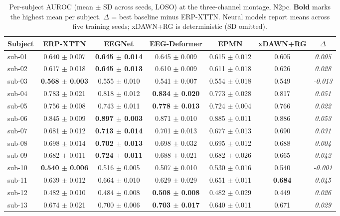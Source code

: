 \begin{table}[t]
\centering
\caption{Per-subject AUROC (mean $\pm$ SD across seeds, LOSO) at the three-channel montage, N2pc. \textbf{Bold} marks the highest mean per subject. $\Delta$ = best baseline minus ERP-XTTN. Neural models report means across five training seeds; xDAWN+RG is deterministic (SD omitted).}
\label{sup:tab-persubj-n2pc}
\begin{tabular}{lcccccc}
\toprule
Subject & ERP-XTTN & EEGNet & EEG-Deformer & EPMN & xDAWN+RG & $\Delta$ \\
\midrule
sub-01 & 0.640 $\pm$ 0.007 & \textbf{0.645 $\pm$ 0.014} & 0.645 $\pm$ 0.009 & 0.615 $\pm$ 0.012 & 0.605 & \textit{0.005} \\
sub-02 & 0.617 $\pm$ 0.018 & \textbf{0.645 $\pm$ 0.013} & 0.610 $\pm$ 0.009 & 0.611 $\pm$ 0.018 & 0.626 & \textit{0.028} \\
sub-03 & \textbf{0.568 $\pm$ 0.003} & 0.555 $\pm$ 0.010 & 0.541 $\pm$ 0.007 & 0.554 $\pm$ 0.018 & 0.549 & \textit{-0.013} \\
sub-04 & 0.783 $\pm$ 0.021 & 0.818 $\pm$ 0.012 & \textbf{0.834 $\pm$ 0.020} & 0.773 $\pm$ 0.028 & 0.817 & \textit{0.051} \\
sub-05 & 0.756 $\pm$ 0.008 & 0.743 $\pm$ 0.011 & \textbf{0.778 $\pm$ 0.013} & 0.724 $\pm$ 0.004 & 0.766 & \textit{0.022} \\
sub-06 & 0.845 $\pm$ 0.009 & \textbf{0.897 $\pm$ 0.003} & 0.871 $\pm$ 0.010 & 0.885 $\pm$ 0.011 & 0.886 & \textit{0.053} \\
sub-07 & 0.681 $\pm$ 0.012 & \textbf{0.713 $\pm$ 0.014} & 0.701 $\pm$ 0.013 & 0.677 $\pm$ 0.013 & 0.690 & \textit{0.031} \\
sub-08 & 0.698 $\pm$ 0.014 & \textbf{0.702 $\pm$ 0.013} & 0.698 $\pm$ 0.032 & 0.695 $\pm$ 0.012 & 0.688 & \textit{0.004} \\
sub-09 & 0.682 $\pm$ 0.011 & \textbf{0.724 $\pm$ 0.011} & 0.688 $\pm$ 0.021 & 0.682 $\pm$ 0.026 & 0.665 & \textit{0.042} \\
sub-10 & \textbf{0.540 $\pm$ 0.006} & 0.516 $\pm$ 0.005 & 0.507 $\pm$ 0.010 & 0.530 $\pm$ 0.016 & 0.540 & \textit{-0.001} \\
sub-11 & 0.639 $\pm$ 0.012 & 0.664 $\pm$ 0.010 & 0.629 $\pm$ 0.029 & 0.651 $\pm$ 0.011 & \textbf{0.684} & \textit{0.045} \\
sub-12 & 0.482 $\pm$ 0.010 & 0.484 $\pm$ 0.008 & \textbf{0.508 $\pm$ 0.008} & 0.482 $\pm$ 0.029 & 0.449 & \textit{0.026} \\
sub-13 & 0.674 $\pm$ 0.021 & 0.700 $\pm$ 0.006 & \textbf{0.703 $\pm$ 0.017} & 0.640 $\pm$ 0.011 & 0.671 & \textit{0.029} \\

\end{tabular}
\end{table}
